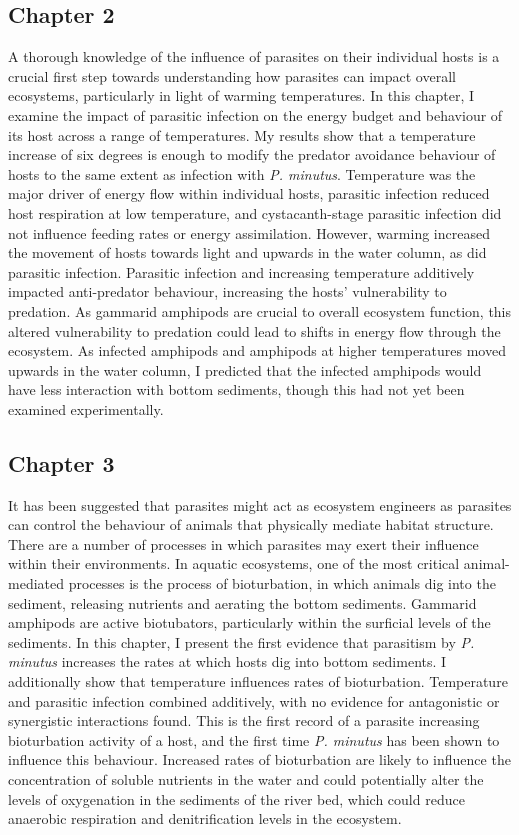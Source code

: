 \subsection{Chapter 2}
A thorough knowledge of the influence of parasites on their individual hosts is a crucial first step towards understanding how parasites can impact overall ecosystems, particularly in light of warming temperatures. In this chapter, I examine the impact of parasitic infection on the energy budget and behaviour of its host across a range of temperatures. My results show that a temperature increase of six degrees is enough to modify the predator avoidance behaviour of hosts to the same extent as infection with \emph{P. minutus}. Temperature was the major driver of energy flow within individual hosts, parasitic infection reduced host respiration at low temperature, and cystacanth-stage parasitic infection did not influence feeding rates or energy assimilation. However, warming increased the movement of hosts towards light and upwards in the water column, as did parasitic infection. Parasitic infection and increasing temperature additively impacted anti-predator behaviour, increasing the hosts' vulnerability to predation. As gammarid amphipods are crucial to overall ecosystem function, this altered vulnerability to predation could lead to shifts in energy flow through the ecosystem. As infected amphipods and amphipods at higher temperatures moved upwards in the water column, I predicted that the infected amphipods would have less interaction with bottom sediments, though this had not yet been examined experimentally. 

\subsection{Chapter 3}
It has been suggested that parasites might act as ecosystem engineers as parasites can control the behaviour of animals that physically mediate habitat structure. There are a number of processes in which parasites may exert their influence within their environments. In aquatic ecosystems, one of the most critical animal-mediated processes is the process of bioturbation, in which animals dig into the sediment, releasing nutrients and aerating the bottom sediments. Gammarid amphipods are active biotubators, particularly within the surficial levels of the sediments. In this chapter, I present the first evidence that parasitism by \emph{P. minutus} increases the rates at which hosts dig into bottom sediments. I additionally show that temperature influences rates of bioturbation. Temperature and parasitic infection combined additively, with no evidence for antagonistic or synergistic interactions found.  This is the first record of a parasite increasing bioturbation activity of a host, and the first time \emph{P. minutus} has been shown to influence this behaviour. Increased rates of bioturbation are likely to influence the concentration of soluble nutrients in the water and could potentially alter the levels of oxygenation in the sediments of the river bed, which could reduce anaerobic respiration and denitrification levels in the ecosystem.  

